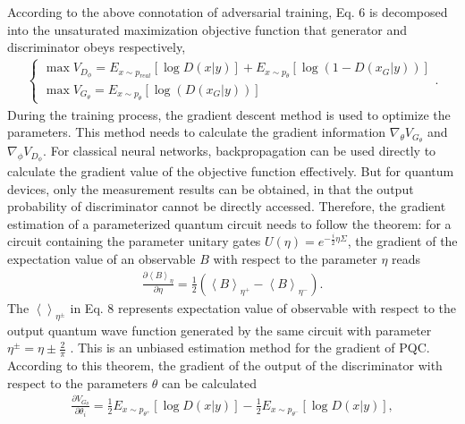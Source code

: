 \documentclass{bmcart}
\begin{document}
According to the above connotation of adversarial training, Eq. 6 is decomposed into the unsaturated maximization objective function that generator and discriminator obeys respectively,
%
\begin{eqnarray}\label{eqexpmuts}
\left\{ {\begin{array}{*{20}{l}}
{\max {V_{{D_\phi }}} = {E_{x \sim {p_{real}}}}\left[ {\log D\left( {x\left| y \right.} \right)} \right] + {E_{x \sim {p_\theta }}}\left[ {\log (1 - D\left( {{x_G}\left| y \right.} \right))} \right]}\\
{\max {V_{{G_\theta }}} = {E_{x \sim {p_\theta }}}\left[ {\log \left( {D\left( {{x_G}\left| y \right.} \right)} \right)} \right]}
\end{array}.} \right.
\end{eqnarray}
%
During the training process, the gradient descent method is used to optimize the parameters. This method needs to calculate the gradient information ${\nabla _\theta }{V_{{G_\theta }}}$ and ${\nabla _\phi }{V_{{D_\phi }}}$. For classical neural networks, backpropagation can be used directly to calculate the gradient value of the objective function effectively. But for quantum devices, only the measurement results can be obtained, in that the output probability of discriminator cannot be directly accessed. Therefore, the gradient estimation of a parameterized quantum circuit needs to follow the theorem: for a circuit containing the parameter unitary gates $U\left( \eta  \right) = {e^{ - \frac{i}{2}\eta \Sigma }}$, the gradient of the expectation value of an observable $B$ with respect to the parameter $\eta $ reads
%
\begin{eqnarray}\label{eqexpmuts}
\frac{{\partial {{\left\langle B \right\rangle }_\eta }}}{{\partial \eta }} = \frac{1}{2}\left( {{{\left\langle B \right\rangle }_{{\eta ^ + }}} - {{\left\langle B \right\rangle }_{{\eta ^ - }}}} \right).
\end{eqnarray}
%
The ${\left\langle  \right\rangle _{{\eta ^ \pm }}}$ in Eq. 8 represents expectation value of observable with respect to the output quantum wave function generated by the same circuit with parameter ${\eta ^ \pm } = \eta  \pm \frac{2}{\pi }$ \cite{LiuJ}. This is an unbiased estimation method for the gradient of PQC. According to this theorem, the gradient of the output of the discriminator with respect to the parameters $\theta $ can be calculated
%
\begin{eqnarray}\label{eqexpmuts}
\frac{{\partial {V_{{G_\theta }}}}}{{\partial {\theta _i}}} = \frac{1}{2}{E_{x \sim {p_{{\theta ^ + }}}}}\left[ {\log D\left( {x\left| y \right.} \right)} \right] - \frac{1}{2}{E_{x \sim {p_{{\theta ^ - }}}}}\left[ {\log D\left( {x\left| y \right.} \right)} \right],
\end{eqnarray}
\end{document}
